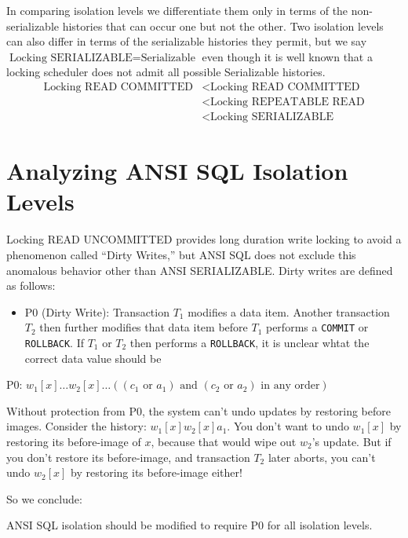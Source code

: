 \documentclass[11pt]{article}
\begin{document}
In comparing isolation levels we differentiate them only in terms of the non-serializable histories
that can occur  one but not the other. Two isolation levels can also differ in terms of the
serializable histories they permit, but we say  \(\text{Locking SERIALIZABLE}=\text{Serializable}\)
even though it is well known that a locking scheduler does not admit all possible Serializable
histories.
\begin{align*}
\text{Locking READ COMMITTED}&<\text{Locking READ COMMITTED}\\
&<\text{Locking REPEATABLE READ}\\
&<\text{Locking SERIALIZABLE}
\end{align*}
\section{Analyzing ANSI SQL Isolation Levels}
\label{sec:orgfc933a1}
Locking READ UNCOMMITTED provides long duration write locking to avoid a phenomenon called ``Dirty
Writes,'' but ANSI SQL does not exclude this anomalous behavior other than ANSI SERIALIZABLE. Dirty
writes are defined as follows:

\begin{itemize}
\item P0 (Dirty Write): Transaction \(T_1\) modifies a data item. Another transaction \(T_2\) then further
modifies that data item before \(T_1\) performs a \texttt{COMMIT} or \texttt{ROLLBACK}. If \(T_1\) or \(T_2\) then
performs a \texttt{ROLLBACK}, it is unclear whtat the correct data value should be
\end{itemize}


\begin{center}
P0: \(w_1[x]\dots w_2[x]\dots((c_1\text{ or }a_1)\text{ and }(c_2\text{ or }a_2)\text{ in any order})\)
\end{center}

Without protection from P0, the system can’t undo updates by restoring before images. Consider the
history: \(w_1[x]w_2[x]a_1\). You don’t want to undo \(w_1[x]\) by restoring its before-image of \(x\), because
that would wipe out \(w_2\)’s update. But if you don’t restore its before-image, and transaction \(T_2\) later aborts,
you can’t undo \(w_2[x]\) by restoring its before-image either!

So we conclude:
\begin{remark}[]
ANSI SQL isolation should be modified to require P0 for all isolation levels.
\end{remark}
\end{document}
